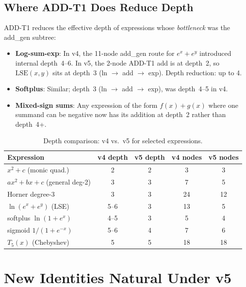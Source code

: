 \documentclass[11pt,a4paper]{article}
\begin{document}
\subsection{Where ADD-T1 Does Reduce Depth}

ADD-T1 reduces the effective depth of expressions whose \emph{bottleneck} was the
add\_gen subtree:

\begin{itemize}
  \item \textbf{Log-sum-exp}: In v4, the 11-node add\_gen route for $e^x + e^y$ introduced
        internal depth~4--6. In v5, the 2-node ADD-T1 add is at depth~2, so
        $\mathrm{LSE}(x,y)$ sits at depth~3 (ln $\to$ add $\to$ exp). Depth reduction: up to 4.
  \item \textbf{Softplus}: Similar; depth~3 (ln $\to$ add $\to$ exp), was depth~4--5 in v4.
  \item \textbf{Mixed-sign sums}: Any expression of the form $f(x) + g(x)$ where one
        summand can be negative now has its addition at depth~2 rather than depth~4+.
\end{itemize}

\begin{table}[h]
\centering
\caption{Depth comparison: v4 vs.\ v5 for selected expressions.}
\label{tab:depth_comparison}
\begin{tabular}{lcccc}
\toprule
Expression & v4 depth & v5 depth & v4 nodes & v5 nodes \\
\midrule
$x^2 + c$ (monic quad.)         & 2 & 2 & 3 & 3 \\
$ax^2 + bx + c$ (general deg-2) & 3 & 3 & 7 & 5 \\
Horner degree-3                  & 3 & 3 & 24 & 12 \\
$\ln(e^x + e^y)$ (LSE)          & 5--6 & 3 & 13 & 5 \\
softplus $\ln(1+e^x)$            & 4--5 & 3 & 5  & 4 \\
sigmoid $1/(1+e^{-x})$           & 5--6 & 4 & 7  & 6 \\
$T_5(x)$ (Chebyshev)            & 5 & 5 & 18 & 18 \\
\bottomrule
\end{tabular}
\end{table}

\section{New Identities Natural Under v5}
\end{document}
